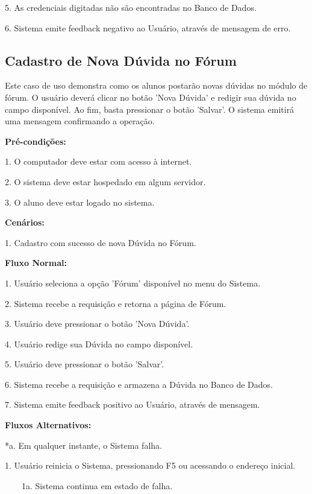 \documentclass[graduacao,brazil]{ThesisPUC}
\begin{document}
5. As credenciais digitadas n\~{a}o s\~{a}o encontradas no Banco de Dados.

6. Sistema emite feedback negativo ao Usu\'{a}rio, atrav\'{e}s de mensagem de erro.

\subsection{Cadastro de Nova D\'{u}vida no F\'{o}rum}

Este caso de uso demonstra como os alunos postar\~{a}o novas d\'{u}vidas no m\'{o}dulo de f\'{o}rum.
O usu\'{a}rio dever\'{a} clicar no bot\~{a}o 'Nova D\'{u}vida' e redigir sua d\'{u}vida no campo dispon\'{i}vel.
Ao fim, basta pressionar o bot\~{a}o 'Salvar'. O sistema emitir\'{a} uma mensagem confirmando a opera\c{c}\~{a}o. 

\textbf{Pr\'{e}-condi\c{c}\~{o}es:}

1. O computador deve estar com acesso \`{a} internet.

2. O sistema deve estar hospedado em algum servidor.

3. O aluno deve estar logado no sistema.


\textbf{Cen\'{a}rios:}

1. Cadastro com sucesso de nova D\'{u}vida no F\'{o}rum.


\textbf{Fluxo Normal:}

1. Usu\'{a}rio seleciona a op\c{c}\~{a}o 'F\'{o}rum' dispon\'{i}vel no menu do Sistema.

2. Sistema recebe a requisi\c{c}\~{a}o e retorna a p\'{a}gina de F\'{o}rum.

3. Usu\'{a}rio deve pressionar o bot\~{a}o 'Nova D\'{u}vida'.

4. Usu\'{a}rio redige sua D\'{u}vida no campo dispon\'{i}vel.

5. Usu\'{a}rio deve pressionar o bot\~{a}o 'Salvar'.

6. Sistema recebe a requisi\c{c}\~{a}o e armazena a D\'{u}vida no Banco de Dados.

7. Sistema emite feedback positivo ao Usu\'{a}rio, atrav\'{e}s de mensagem.


\textbf{Fluxos Alternativos:}

*a. Em qualquer instante, o Sistema falha.

1. Usu\'{a}rio reinicia o Sistema, pressionando F5 ou acessando o endere\c{c}o inicial.

\ \ \ \ 1a. Sistema continua em estado de falha.
\end{document}
